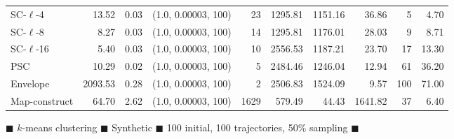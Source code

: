 \begin{figure}
\begin{center}
\begin{minipage}{\textwidth}
{\begin{tabular}{@{}lrrrrrrrrr@{}}
SC-$\ell$-4 & 13.52 & 0.03 & (1.0, 0.00003, 100) & 23 & 1295.81 & 1151.16 & 36.86 & 5 & 4.70\\
SC-$\ell$-8 & 8.27 & 0.03 & (1.0, 0.00003, 100) & 14 & 1295.81 & 1176.01 & 28.03 & 9 & 8.71\\
SC-$\ell$-16 & 5.40 & 0.03 & (1.0, 0.00003, 100) & 10 & 2556.53 & 1187.21 & 23.70 & 17 & 13.30\\
PSC & 10.29 & 0.02 & (1.0, 0.00003, 100) & 5 & 2484.46 & 1246.04 & 12.94 & 61 & 36.20\\
Envelope & 2093.53 & 0.28 & (1.0, 0.00003, 100) & 2 & 2506.83 & 1524.09 & 9.57 & 100 & 71.00\\
Map-construct & 64.70 & 2.62 & (1.0, 0.00003, 100) & 1629 & 579.49 & 44.43 & 1641.82 & 37 & 6.40\\
        \bottomrule
    \end{tabular}
    }
  \end{minipage}
  \end{center}
        \caption{
        $\blacksquare$ $k$-means clustering $\blacksquare$ Synthetic $\blacksquare$ 100 initial, 100 trajectories, 50\% sampling $\blacksquare$}

    \end{figure}
